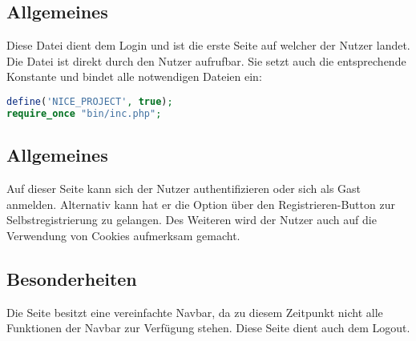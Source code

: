 \subsection{Allgemeines} Diese Datei dient dem Login und ist die erste Seite auf welcher der Nutzer landet.
Die Datei ist direkt durch den Nutzer aufrufbar. Sie setzt auch die entsprechende Konstante und bindet alle notwendigen Dateien ein:
\begin{lstlisting}[language=php]
define('NICE_PROJECT', true);
require_once "bin/inc.php";
\end{lstlisting}
\subsection{Allgemeines}
Auf dieser Seite kann sich der Nutzer authentifizieren oder sich als Gast anmelden. Alternativ kann hat er die Option über den Registrieren-Button zur Selbstregistrierung zu gelangen. Des Weiteren wird der Nutzer auch auf die Verwendung von Cookies aufmerksam gemacht.
\subsection{Besonderheiten}
Die Seite besitzt eine vereinfachte Navbar, da zu diesem Zeitpunkt nicht alle Funktionen der Navbar zur Verfügung stehen. Diese Seite dient auch dem Logout.
